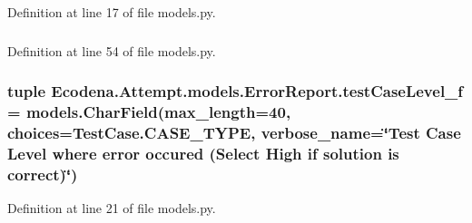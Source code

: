 Definition at line 17 of file models.py.

\hypertarget{class_ecodena_1_1_attempt_1_1models_1_1_error_report_ad6bef1ac293f3dd474cc47975aa77be2}{
\subsubsection[{testCaseLevel\_\-f}]{}}
\label{df/d02/class_ecodena_1_1_attempt_1_1models_1_1_error_report_ad6bef1ac293f3dd474cc47975aa77be2}


Definition at line 54 of file models.py.

\hypertarget{class_ecodena_1_1_attempt_1_1models_1_1_error_report_abb78bf4e72de46a0c4d144d5e95ed80d}{
\subsubsection[{testCaseLevel\_\-f}]{\setlength{\rightskip}{0pt plus 5cm}tuple {\bf Ecodena.Attempt.models.ErrorReport.testCaseLevel\_\-f} = models.CharField(max\_\-length=40, choices=TestCase.CASE\_\-TYPE, verbose\_\-name=\char`\"{}Test Case Level where error occured (Select High if solution is correct)\char`\"{})}}
\label{df/d02/class_ecodena_1_1_attempt_1_1models_1_1_error_report_abb78bf4e72de46a0c4d144d5e95ed80d}


Definition at line 21 of file models.py.

\hypertarget{class_ecodena_1_1_attempt_1_1models_1_1_error_report_ab3b846491a8aa2fa4135ed71f0eedfd0}{
\subsubsection[{timeRequirement\_\-f}]{}}
\label{df/d02/class_ecodena_1_1_attempt_1_1models_1_1_error_report_ab3b846491a8aa2fa4135ed71f0eedfd0}


